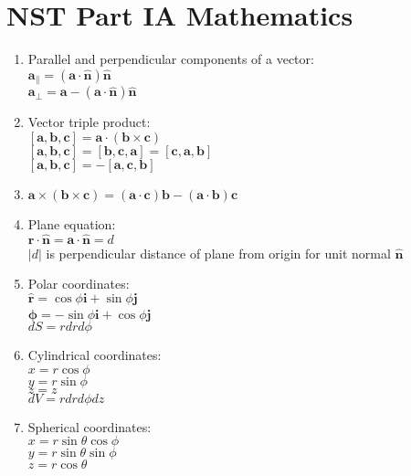 \documentclass[fleqn]{article}
\author{Victor Zhao\\xz398@cam.ac.uk}
\begin{document}
\centering
\section*{NST Part IA Mathematics}
\MyAuthor

\begin{enumerate}
    \item Parallel and perpendicular components of a vector:\\
        $\mathbf{a}_\parallel=(\mathbf{a}\cdot\hat{\mathbf{n}})\hat{\mathbf{n}}$\\
        $\mathbf{a}_\perp=\mathbf{a}-(\mathbf{a}\cdot\hat{\mathbf{n}})\hat{\mathbf{n}}$
    \item Vector triple product:\\
        $[\mathbf{a},\mathbf{b},\mathbf{c}]=\mathbf{a}\cdot(\mathbf{b}\times\mathbf{c})$\\
        $[\mathbf{a},\mathbf{b},\mathbf{c}]=[\mathbf{b},\mathbf{c},\mathbf{a}]=[\mathbf{c},\mathbf{a},\mathbf{b}]$\\
        $[\mathbf{a},\mathbf{b},\mathbf{c}]=-[\mathbf{a},\mathbf{c},\mathbf{b}]$
    \item $\mathbf{a}\times(\mathbf{b}\times\mathbf{c})=(\mathbf{a}\cdot\mathbf{c})\mathbf{b}-(\mathbf{a}\cdot\mathbf{b})\mathbf{c}$
    \item Plane equation:\\
        $\mathbf{r}\cdot\hat{\mathbf{n}}=\mathbf{a}\cdot\hat{\mathbf{n}}=d$\\
        $|$$d$$|$ is perpendicular distance of plane from origin for unit normal $\hat{\mathbf{n}}$
    \item Polar coordinates:\\
        $\hat{\mathbf{r}}=\cos\phi\mathbf{i}+\sin\phi\mathbf{j}$\\
        $\hat{\bm{\phi}}=-\sin\phi\mathbf{i}+\cos\phi\mathbf{j}$\\
        $dS=rdrd\phi$
    \item Cylindrical coordinates:\\
        $x=r\cos\phi$\\
        $y=r\sin\phi$\\
        $z=z$\\
        $dV=rdrd\phi dz$
    \item Spherical coordinates:\\
        $x=r\sin\theta\cos\phi$\\
        $y=r\sin\theta\sin\phi$\\
        $z=r\cos\theta$\smallbreak

\end{enumerate}
\end{document}

